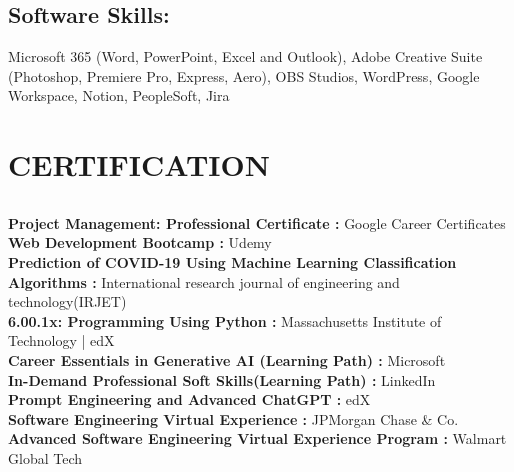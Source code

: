 \documentclass[a4paper]{deedy-resume} %
\begin{document}
\begin{minipage}[t]{0.33\textwidth}
\sectionspace %



\subsection{Software Skills: }

Microsoft 365 (Word, PowerPoint, Excel and Outlook), 
Adobe Creative Suite (Photoshop, Premiere Pro, Express, Aero),
OBS Studios, WordPress, Google Workspace, Notion, PeopleSoft, Jira


\sectionspace %


\section{CERTIFICATION}




\subsection{}


\textbullet{} \textbf{Project Management: Professional Certificate :}  Google Career Certificates   \\
\textbullet{}\textbf{Web Development Bootcamp :}  Udemy  \\
\textbullet{}\textbf{Prediction of COVID-19 Using Machine Learning Classification Algorithms :}  International research journal of engineering and technology(IRJET)   \\
\textbullet{}\textbf{6.00.1x: Programming Using Python :}  Massachusetts Institute of Technology | edX \\
\textbullet{}\textbf{Career Essentials in Generative AI (Learning Path) :} Microsoft  \\
\textbullet{}\textbf{In-Demand Professional Soft Skills(Learning Path) :} LinkedIn  \\
\textbullet{}\textbf{Prompt Engineering and Advanced ChatGPT :}  edX  \\
\textbullet{}\textbf{Software Engineering Virtual Experience :}  JPMorgan Chase \& Co. \\
\textbullet{}\textbf{Advanced Software Engineering Virtual Experience Program :}  Walmart Global Tech \\


\sectionspace %






\end{minipage} %
\end{document}
